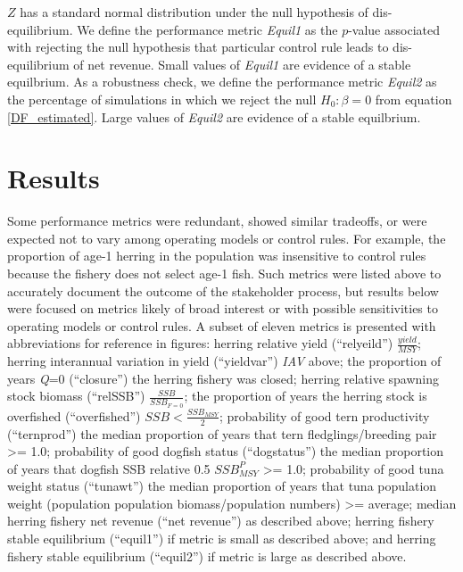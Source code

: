 \documentclass[]{article}
\begin{document}
\(Z\) has a standard normal distribution under the null hypothesis of
dis-equilibrium. We define the performance metric \emph{Equil1} as the
\(p\)-value associated with rejecting the null hypothesis that
particular control rule leads to dis-equilibrium of net revenue. Small
values of \emph{Equil1} are evidence of a stable equilbrium. As a
robustness check, we define the performance metric \emph{Equil2} as the
percentage of simulations in which we reject the null \(H_0: \beta=0\)
from equation \ref{DF_estimated}. Large values of \emph{Equil2} are
evidence of a stable equilbrium.

\section{Results}\label{results}

Some performance metrics were redundant, showed similar tradeoffs, or
were expected not to vary among operating models or control rules. For
example, the proportion of age-1 herring in the population was
insensitive to control rules because the fishery does not select age-1
fish. Such metrics were listed above to accurately document the outcome
of the stakeholder process, but results below were focused on metrics
likely of broad interest or with possible sensitivities to operating
models or control rules. A subset of eleven metrics is presented with
abbreviations for reference in figures: herring relative yield
(``relyeild'') \(\frac{yield}{MSY}\); herring interannual variation in
yield (``yieldvar'') \emph{IAV} above; the proportion of years
\emph{Q}=0 (``closure'') the herring fishery was closed; herring
relative spawning stock biomass (``relSSB'') \(\frac{SSB}{SSB_{F=0}}\);
the proportion of years the herring stock is overfished (``overfished'')
\(SSB < \frac{SSB_{MSY}}{2}\); probability of good tern productivity
(``ternprod'') the median proportion of years that tern
fledglings/breeding pair \textgreater{}= 1.0; probability of good
dogfish status (``dogstatus'') the median proportion of years that
dogfish SSB relative 0.5 \(SSB_{MSY}^P\) \textgreater{}= 1.0;
probability of good tuna weight status (``tunawt'') the median
proportion of years that tuna population weight (population population
biomass/population numbers) \textgreater{}= average; median herring
fishery net revenue (``net revenue'') as described above; herring
fishery stable equilibrium (``equil1'') if metric is small as described
above; and herring fishery stable equilibrium (``equil2'') if metric is
large as described above.
\end{document}

